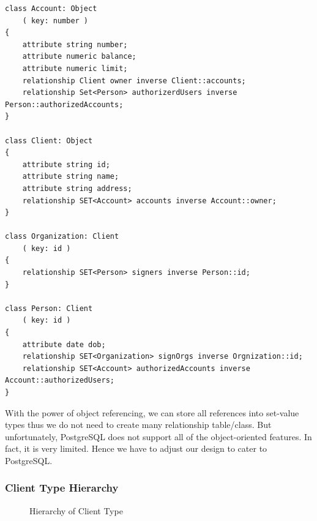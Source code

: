 \documentclass[11pt]{article}
\begin{document}
\begin{verbatim}
class Account: Object
    ( key: number )
{
    attribute string number;
    attribute numeric balance;
    attribute numeric limit;
    relationship Client owner inverse Client::accounts;
    relationship Set<Person> authorizerdUsers inverse Person::authorizedAccounts;
}

class Client: Object
{
    attribute string id;
    attribute string name;
    attribute string address;
    relationship SET<Account> accounts inverse Account::owner;
}

class Organization: Client
    ( key: id )
{
    relationship SET<Person> signers inverse Person::id;
}

class Person: Client
    ( key: id )
{
    attribute date dob;
    relationship SET<Organization> signOrgs inverse Orgnization::id;
    relationship SET<Account> authorizedAccounts inverse Account::authorizedUsers;
}
\end{verbatim}

\par
With the power of object referencing, we can store all references into set-value types thus we do not need to create many relationship table/class. But unfortunately, PostgreSQL does not support all of the object-oriented features. In fact, it is very limited. Hence we have to adjust our design to cater to PostgreSQL.

\subsubsection{Client Type Hierarchy}

\begin{figure}
\caption{Hierarchy of Client Type}
\label{fig:clienthierarchy}
\end{figure}
\end{document}
